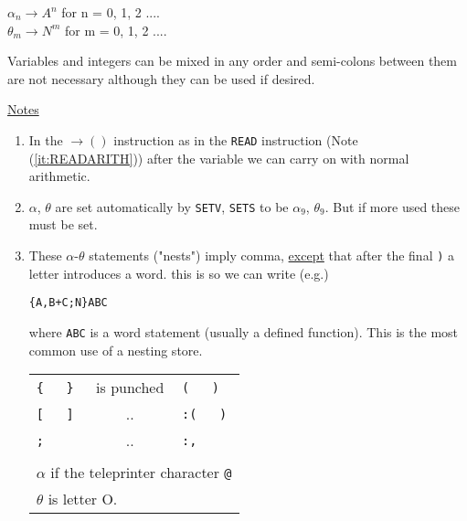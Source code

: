\documentclass[10pt, a4paper, oneside]{article}
\newcommand{\myuline}[1]{\uline{#1}}
\newcommand{\mytt}[1]{\texttt{\scriptsize #1}}
\newcommand{\mytt}[1]{\texttt{\small #1}}
\begin{document}
\begin{multicols}{2}
\begin{addmargin}[1cm]{1em}%
$\alpha_{n} \rightarrow A^{n}$ for n = 0, 1, 2 .... \\
$\theta_{m} \rightarrow N^{m}$ for m = 0, 1, 2 .... \\
\end{addmargin}

Variables and integers can be mixed in any order
and semi-colons between them are not necessary although
they can be used if desired.

\begin{flushleft}
\myuline{Notes}
\end{flushleft}

\renewcommand{\labelenumi}{(\roman{enumi})}
\begin{enumerate}
\def\theenumi{\roman{enumi}}

\item In the $\rightarrow( )$ instruction as in the \mytt{READ}
instruction (Note (\ref{it:READARITH})) after the variable we can carry
on with normal arithmetic.

\item $\alpha$, $\theta$ are set automatically by \mytt{SETV}, \mytt{SETS} to be
$\alpha_{9}$, $\theta_{9}$.  But if more used these must be set.

\item These $\alpha$-$\theta$ statements ("nests") imply comma, \myuline{except}
that after the final \mytt{)} a letter introduces a word.
this is so we can write (e.g.)

\begin{addmargin}[1cm]{1em}%
\begin{lstlisting}
{A,B+C;N}ABC
\end{lstlisting}
\end{addmargin}

where \mytt{ABC} is a word statement (usually a defined
function).  This is the most common use of a nesting
store.

\begin{addmargin}[1cm]{1em}%
\begin{tabular}{lcl}
\mytt{\{\ \ \ \}} & is punched & \mytt{*(\ \ \ )} \\
\mytt{[\ \ \ ]} & .. & \mytt{:(\ \ \ )} \\
\mytt{;} & .. & \mytt{:,} \\
  & & \\
\multicolumn{3}{l}{$\alpha$ if the teleprinter character \mytt{@}} \\
\multicolumn{3}{l}{$\theta$ is letter O.} \\
\end{tabular}
\end{addmargin}


\end{enumerate}
\end{multicols}
\end{document}
